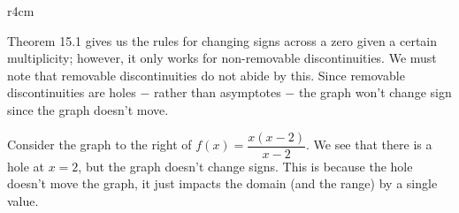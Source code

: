\documentclass[lang=en,11pt]{elegantbook}
\begin{document}
\begin{wrapfigure}{r}{4cm}
\end{wrapfigure}

Theorem 15.1 gives us the rules for changing signs across a zero given a certain multiplicity; however, it only works for non-removable discontinuities.  We must note that removable discontinuities do not abide by this.  Since removable discontinuities are holes $-$ rather than asymptotes $-$ the graph won't change sign since the graph doesn't move.

Consider the graph to the right of $f(x)=\dfrac{x(x-2)}{x-2}$.  We see that there is a hole at $x=2$, but the graph doesn't change signs. This is because the hole doesn't move the graph, it just impacts the domain (and the range) by a single value.
\end{document}

